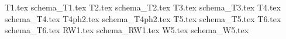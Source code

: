 \documentclass[spanish,a4paper,oneside]{article}
\begin{document}
{T1.tex}
{schema_T1.tex}
{T2.tex}
{schema_T2.tex}
{T3.tex}
{schema_T3.tex}
{T4.tex}
{schema_T4.tex}
{T4ph2.tex}
{schema_T4ph2.tex}
{T5.tex}
{schema_T5.tex}
{T6.tex}
{schema_T6.tex}
{RW1.tex}
{schema_RW1.tex}
{W5.tex}
{schema_W5.tex}
\end{document}
